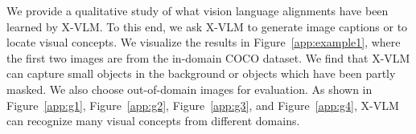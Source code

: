 \documentclass{article}
\newcommand{\baby}{X-VLM\xspace}
\begin{document}
We provide a qualitative study of what vision language alignments have been learned by \baby. To this end, we ask \baby to generate image captions or to locate visual concepts. We visualize the results in Figure~\ref{app:example1}, where the first two images are from the in-domain COCO dataset. We find that \baby can capture small objects in the background or objects which have been partly masked. We also choose out-of-domain images for evaluation. As shown in Figure~\ref{app:g1}, Figure~\ref{app:g2}, Figure~\ref{app:g3}, and Figure~\ref{app:g4}, \baby can recognize many visual concepts from different domains. 



 
\end{document}
